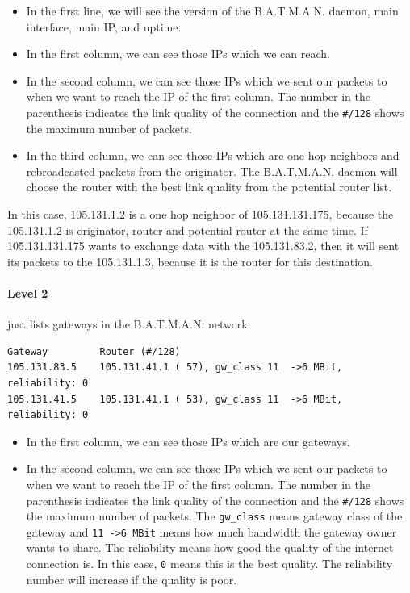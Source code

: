 \documentclass[
	12pt,
	a4paper,
	twoside,
	english,
	headsepline,
	footnosepline,
	automark,
	normalheadings,
	openany,
	cleardoubleplain,
	abstracton,
	idxtotoc,
	liststotoc,
	bibtotoc,
 	BCOR8mm,
]{scrartcl}
\begin{document}
\begin{itemize}
\item In the first line, we will see the version of the B.A.T.M.A.N. daemon, main interface, main IP, and uptime.
\item In the first column, we can see those IPs which we can reach.
\item In the second column, we can see those IPs which we sent our packets to when we want to reach the IP of the first column. The number in the parenthesis indicates the link quality of the connection and the \verb|#/128| shows the maximum number of packets.
\item In the third column, we can see those IPs which are one hop neighbors and rebroadcasted packets from the originator. The B.A.T.M.A.N. daemon will choose the router with the best link quality from the potential router list.
\end{itemize}

In this case, 105.131.1.2 is a one hop neighbor of 105.131.131.175, because the 105.131.1.2 is originator, router and potential router at the same time. If 105.131.131.175 wants to exchange data with the 105.131.83.2, then it will sent its packets to the 105.131.1.3, because it is the router for this destination.

\paragraph*{Level 2}
just lists gateways in the B.A.T.M.A.N. network.

\begin{lstlisting}[basicstyle=\footnotesize,	frame=single, columns= flexible]
Gateway         Router (#/128)
105.131.83.5    105.131.41.1 ( 57), gw_class 11  ->6 MBit, reliability: 0
105.131.41.5    105.131.41.1 ( 53), gw_class 11  ->6 MBit, reliability: 0
\end{lstlisting}

\begin{itemize}
\item In the first column, we can see those IPs which are our gateways.
\item In the second column, we can see those IPs which we sent our packets to when we want to reach the IP of the first column. The number in the parenthesis indicates the link quality of the connection and the \verb|#/128| shows the maximum number of packets. The \verb|gw_class| means gateway class of the gateway and \verb|11 ->6 MBit| means how much bandwidth the gateway owner wants to share. The reliability means how good the quality of the internet connection is. In this case, \verb|0| means this is the best quality. The reliability number will increase if the quality is poor.
\end{itemize}
\end{document}
